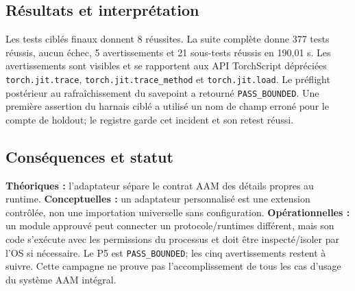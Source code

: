 \documentclass[11pt,a4paper]{article}
\begin{document}
\subsection{Résultats et interprétation}
Les tests ciblés finaux donnent 8 réussites. La suite complète donne 377 tests réussis, aucun échec, 5 avertissements et 21 sous-tests réussis en 190,01 s. Les avertissements sont visibles et se rapportent aux API TorchScript dépréciées \texttt{torch.jit.trace}, \texttt{torch.jit.trace\_method} et \texttt{torch.jit.load}. Le préflight postérieur au rafraîchissement du savepoint a retourné \texttt{PASS\_BOUNDED}. Une première assertion du harnais ciblé a utilisé un nom de champ erroné pour le compte de holdout; le registre garde cet incident et son retest réussi.

\subsection{Conséquences et statut}
\textbf{Théoriques :} l'adaptateur sépare le contrat AAM des détails propres au runtime. \textbf{Conceptuelles :} un adaptateur personnalisé est une extension contrôlée, non une importation universelle sans configuration. \textbf{Opérationnelles :} un module approuvé peut connecter un protocole/runtimes différent, mais son code s'exécute avec les permissions du processus et doit être inspecté/isoler par l'OS si nécessaire. Le P5 est \texttt{PASS\_BOUNDED}; les cinq avertissements restent à suivre. Cette campagne ne prouve pas l'accomplissement de tous les cas d'usage du système AAM intégral.


\end{document}
